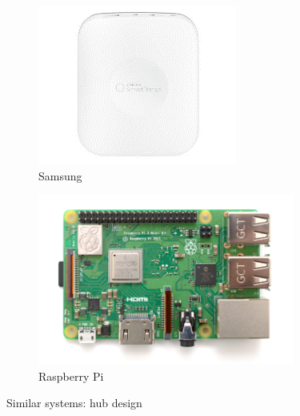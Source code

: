 \documentclass[12pt, oneside, a4paper]{book}
\begin{document}
\begin{figure}[H]
			\begin{subfigure}[b]{.5\linewidth}
			\includegraphics[width=\linewidth]{img/samsung_hw.png}
				\caption{Samsung}
			\end{subfigure}
			\begin{subfigure}[b]{.5\linewidth}
				\includegraphics[width=\linewidth]{img/raspberry.png}
				\caption{Raspberry Pi}
			\end{subfigure}
			\caption{Similar systems: hub design}
		\end{figure}
\end{document}
